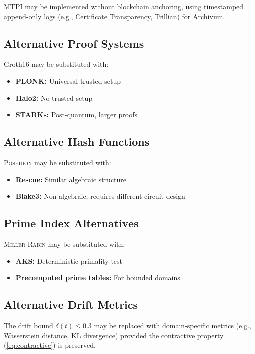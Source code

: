 \documentclass[11pt,a4paper]{article}
\newcommand{\Archivum}{\textsf{Archivum}}
\newcommand{\Poseidon}{\textsc{Poseidon}}
\newcommand{\MillerRabin}{\textsc{Miller-Rabin}}
\begin{document}
MTPI may be implemented without blockchain anchoring, using timestamped append-only logs (e.g., Certificate Transparency, Trillian) for \Archivum{}.

\subsection{Alternative Proof Systems}

Groth16 may be substituted with:
\begin{itemize}[noitemsep]
    \item \textbf{PLONK:} Universal trusted setup
    \item \textbf{Halo2:} No trusted setup
    \item \textbf{STARKs:} Post-quantum, larger proofs
\end{itemize}

\subsection{Alternative Hash Functions}

\Poseidon{} may be substituted with:
\begin{itemize}[noitemsep]
    \item \textbf{Rescue:} Similar algebraic structure
    \item \textbf{Blake3:} Non-algebraic, requires different circuit design
\end{itemize}

\subsection{Prime Index Alternatives}

\MillerRabin{} may be substituted with:
\begin{itemize}[noitemsep]
    \item \textbf{AKS:} Deterministic primality test
    \item \textbf{Precomputed prime tables:} For bounded domains
\end{itemize}

\subsection{Alternative Drift Metrics}

The drift bound $\delta(t) \leq 0.3$ may be replaced with domain-specific metrics (e.g., Wasserstein distance, KL divergence) provided the contractive property (\ref{eq:contractive}) is preserved.
\end{document}
